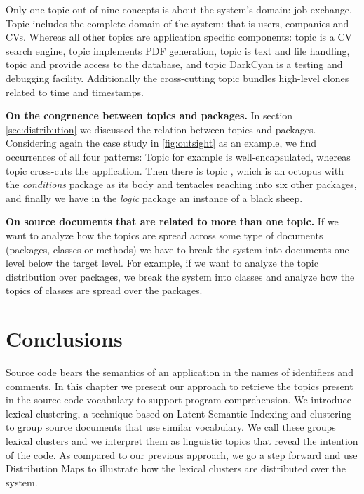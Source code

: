 Only one topic out of nine concepts is about the system's domain: job exchange. Topic \red includes the complete domain of the system: that is users, companies and CVs. Whereas all other topics are application specific components: topic \blue is a CV search engine, topic \darkgreen implements PDF generation, topic \green is text and file handling, topic \cyan and \magenta provide access to the database, and topic DarkCyan is a testing and debugging facility. Additionally the cross-cutting topic \yellow bundles high-level clones related to time and timestamps.

\textbf{On the congruence between topics and packages.} In section \autoref{sec:distribution} we discussed the relation between topics and packages. Considering again the case study in \autoref{fig:outsight} as an example, we find occurrences of all four patterns: Topic \darkgreen for example is well-encapsulated, whereas topic \yellow cross-cuts the application. Then there is topic \blue, which is an octopus with the \emph{conditions} package as its body and tentacles reaching into six other packages, and finally we have in the \emph{logic} package an instance of a black sheep.

\textbf{On source documents that are related to more than one topic.} If we want to analyze how the topics are spread across some type of documents (\eg packages, classes or methods) we have to break the system into documents one level below the target level. For example, if we want to analyze the topic distribution over packages, we break the system into classes and analyze how the topics of classes are spread over the packages.

\section{Conclusions}\label{sec:conclusions}

Source code bears the semantics of an application in the names of identifiers and comments. In this chapter we present our approach to retrieve the topics present in the source code vocabulary to support program comprehension. We introduce lexical clustering, a technique based on Latent Semantic Indexing and clustering to group source documents that use similar vocabulary. We call these groups lexical clusters and we interpret them as linguistic topics that reveal the intention of the code. As compared to our previous approach, we go a step forward and use Distribution Maps to illustrate how the lexical clusters are distributed over the system.

